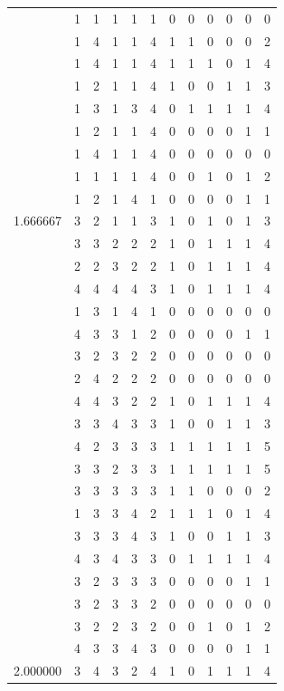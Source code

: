 \documentclass[]{book}
\theoremstyle{definition}
\theoremstyle{definition}
\theoremstyle{definition}
\theoremstyle{remark}
\begin{document}
\begin{table}
{\begin{tabular}[t]{rrrrrrrrrrrr}
 & 1 & 1 & 1 & 1 & 1 & 0 & 0 & 0 & 0 & 0 & 0\\
 & 1 & 4 & 1 & 1 & 4 & 1 & 1 & 0 & 0 & 0 & 2\\
 & 1 & 4 & 1 & 1 & 4 & 1 & 1 & 1 & 0 & 1 & 4\\
 & 1 & 2 & 1 & 1 & 4 & 1 & 0 & 0 & 1 & 1 & 3\\
 & 1 & 3 & 1 & 3 & 4 & 0 & 1 & 1 & 1 & 1 & 4\\
 & 1 & 2 & 1 & 1 & 4 & 0 & 0 & 0 & 0 & 1 & 1\\
 & 1 & 4 & 1 & 1 & 4 & 0 & 0 & 0 & 0 & 0 & 0\\
 & 1 & 1 & 1 & 1 & 4 & 0 & 0 & 1 & 0 & 1 & 2\\
 & 1 & 2 & 1 & 4 & 1 & 0 & 0 & 0 & 0 & 1 & 1\\
1.666667 & 3 & 2 & 1 & 1 & 3 & 1 & 0 & 1 & 0 & 1 & 3\\
 & 3 & 3 & 2 & 2 & 2 & 1 & 0 & 1 & 1 & 1 & 4\\
 & 2 & 2 & 3 & 2 & 2 & 1 & 0 & 1 & 1 & 1 & 4\\
 & 4 & 4 & 4 & 4 & 3 & 1 & 0 & 1 & 1 & 1 & 4\\
 & 1 & 3 & 1 & 4 & 1 & 0 & 0 & 0 & 0 & 0 & 0\\
 & 4 & 3 & 3 & 1 & 2 & 0 & 0 & 0 & 0 & 1 & 1\\
 & 3 & 2 & 3 & 2 & 2 & 0 & 0 & 0 & 0 & 0 & 0\\
 & 2 & 4 & 2 & 2 & 2 & 0 & 0 & 0 & 0 & 0 & 0\\
 & 4 & 4 & 3 & 2 & 2 & 1 & 0 & 1 & 1 & 1 & 4\\
 & 3 & 3 & 4 & 3 & 3 & 1 & 0 & 0 & 1 & 1 & 3\\
 & 4 & 2 & 3 & 3 & 3 & 1 & 1 & 1 & 1 & 1 & 5\\
 & 3 & 3 & 2 & 3 & 3 & 1 & 1 & 1 & 1 & 1 & 5\\
 & 3 & 3 & 3 & 3 & 3 & 1 & 1 & 0 & 0 & 0 & 2\\
 & 1 & 3 & 3 & 4 & 2 & 1 & 1 & 1 & 0 & 1 & 4\\
 & 3 & 3 & 3 & 4 & 3 & 1 & 0 & 0 & 1 & 1 & 3\\
 & 4 & 3 & 4 & 3 & 3 & 0 & 1 & 1 & 1 & 1 & 4\\
 & 3 & 2 & 3 & 3 & 3 & 0 & 0 & 0 & 0 & 1 & 1\\
 & 3 & 2 & 3 & 3 & 2 & 0 & 0 & 0 & 0 & 0 & 0\\
 & 3 & 2 & 2 & 3 & 2 & 0 & 0 & 1 & 0 & 1 & 2\\
 & 4 & 3 & 3 & 4 & 3 & 0 & 0 & 0 & 0 & 1 & 1\\
2.000000 & 3 & 4 & 3 & 2 & 4 & 1 & 0 & 1 & 1 & 1 & 4\\

\end{tabular}}
\end{table}
\end{document}
